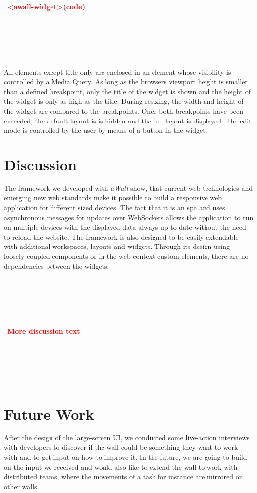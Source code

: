 \documentclass{sigchi}
\newcommand\todo[1]{\\~\\~\\~\\~\\~\textbf{\huge{\textcolor{red}{#1}}}\\~\\~\\~\\~\\~}
\begin{document}
\todo{\textless{}awall-widget\textgreater (code)}
 
All elements except title-only are enclosed in an element whose visibility is controlled by a Media Query.
As long as the browsers viewport height is smaller than a defined breakpoint, only the title of the widget is shown and the height of the widget is only as high as the title.
During resizing, the width and height of the widget are compared to the breakpoints.
Once both breakpoints have been exceeded, the default layout is is hidden and the full layout is displayed.
The edit mode is controlled by the user by means of a button in the widget.


\section{Discussion}

The framework we developed with \textit{aWall} show, that current web technologies and emerging new web standards make it possible to build a responsive web application for different sized devices. 
The fact that it is an \gls{spa} and uses asynchronous messages for updates over WebSockets allows the application to run on multiple devices with the displayed data always up-to-date without the need to reload the website.
The framework is also designed to be easily extendable with additional workspaces, layouts and widgets.
Through its design using loosely-coupled components or in the web context custom elements, there are no dependencies between the widgets.

\todo{More discussion text}

\section{Future Work}
After the design of the large-screen UI, we conducted some live-action interviews with developers to discover if the wall could be something they want to work with and to get input on how to improve it.
In the future, we are going to build on the input we received and would also like to extend the wall to work with distributed teams, where the movements  of a task for instance are mirrored on other walls.



\balance{}



\end{document}
